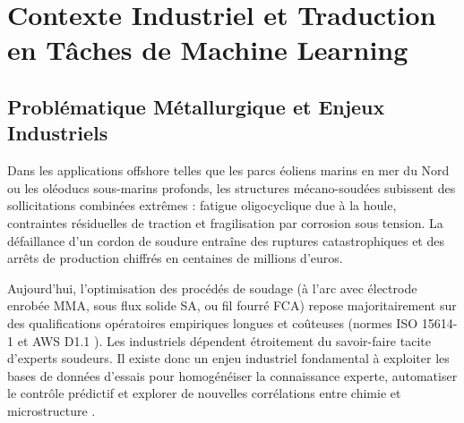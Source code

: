 \documentclass[11pt,a4paper]{article}
\begin{document}
\vspace{0.1cm}
\tableofcontents
\vspace{0.3cm}

\section{Contexte Industriel et Traduction en Tâches de Machine Learning}
\label{sec:contexte}

\subsection{Problématique Métallurgique et Enjeux Industriels}
Dans les applications offshore telles que les parcs éoliens marins en mer du Nord ou les oléoducs sous-marins profonds, les structures mécano-soudées subissent des sollicitations combinées extrêmes : fatigue oligocyclique due à la houle, contraintes résiduelles de traction et fragilisation par corrosion sous tension. La défaillance d'un cordon de soudure entraîne des ruptures catastrophiques et des arrêts de production chiffrés en centaines de millions d'euros. 

Aujourd'hui, l'optimisation des procédés de soudage (à l'arc avec électrode enrobée MMA, sous flux solide SA, ou fil fourré FCA) repose majoritairement sur des qualifications opératoires empiriques longues et coûteuses (normes ISO 15614-1 et AWS D1.1 \cite{aws2020}). Les industriels dépendent étroitement du savoir-faire tacite d'experts soudeurs. Il existe donc un enjeu industriel fondamental à exploiter les bases de données d'essais pour homogénéiser la connaissance experte, automatiser le contrôle prédictif et explorer de nouvelles corrélations entre chimie et microstructure \cite{cool1997}.
\end{document}
